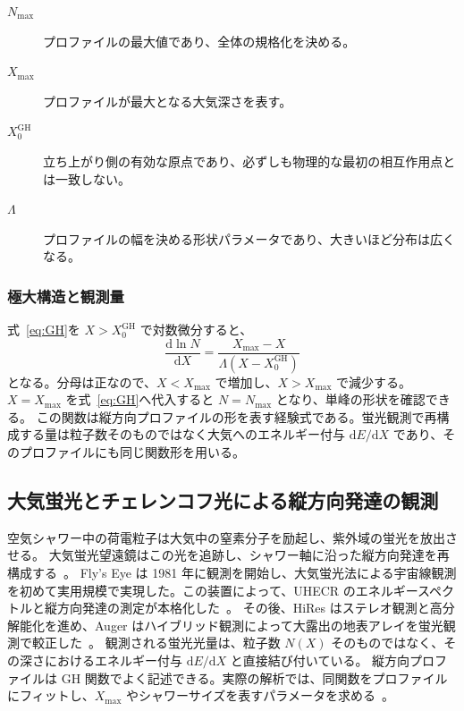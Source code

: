 \documentclass[book,paper=a4,fontsize=11pt]{jlreq}
\begin{document}
\begin{description}
  \item[\(N_{\max}\)] プロファイルの最大値であり、全体の規格化を決める。
  \item[\(X_{\max}\)] プロファイルが最大となる大気深さを表す。
  \item[\(X_0^{\mathrm{GH}}\)] 立ち上がり側の有効な原点であり、必ずしも物理的な最初の相互作用点とは一致しない。
  \item[\(\Lambda\)] プロファイルの幅を決める形状パラメータであり、大きいほど分布は広くなる。
\end{description}

\subsubsection{極大構造と観測量}
式~\eqref{eq:GH}を \(X>X_0^{\mathrm{GH}}\) で対数微分すると、
\begin{equation}
  \frac{\mathrm d\ln N}{\mathrm dX}
  =\frac{X_{\max}-X}{\Lambda(X-X_0^{\mathrm{GH}})}
  \label{eq:dGH}
\end{equation}
となる。分母は正なので、\(X<X_{\max}\) で増加し、\(X>X_{\max}\) で減少する。\(X=X_{\max}\) を式~\eqref{eq:GH}へ代入すると \(N=N_{\max}\) となり、単峰の形状を確認できる。
この関数は縦方向プロファイルの形を表す経験式である。蛍光観測で再構成する量は粒子数そのものではなく大気へのエネルギー付与 \(\mathrm dE/\mathrm dX\) であり、そのプロファイルにも同じ関数形を用いる。

\subsection{大気蛍光とチェレンコフ光による縦方向発達の観測}\label{subsec:fluorescence}
空気シャワー中の荷電粒子は大気中の窒素分子を励起し、紫外域の蛍光を放出させる。
大気蛍光望遠鏡はこの光を追跡し、シャワー軸に沿った縦方向発達を再構成する~\cite{PDGCosmicRays,Stanev2004,TALEMassComposition2026}。
Fly's Eye は 1981 年に観測を開始し、大気蛍光法による宇宙線観測を初めて実用規模で実現した。この装置によって、UHECR のエネルギースペクトルと縦方向発達の測定が本格化した~\cite{BluemerEngelHorandel2009}。
その後、HiRes はステレオ観測と高分解能化を進め、Auger はハイブリッド観測によって大露出の地表アレイを蛍光観測で較正した~\cite{FlysEyeSpectrum1994,HiResGZK2008,AugerXmax2014}。
観測される蛍光光量は、粒子数 \(N(X)\) そのものではなく、その深さにおけるエネルギー付与 \(\mathrm{d}E/\mathrm{d}X\) と直接結び付いている。
縦方向プロファイルは GH 関数でよく記述できる。実際の解析では、同関数をプロファイルにフィットし、\(X_{\max}\) やシャワーサイズを表すパラメータを求める~\cite{GaisserHillas1977,PDGCosmicRays}。
\end{document}
